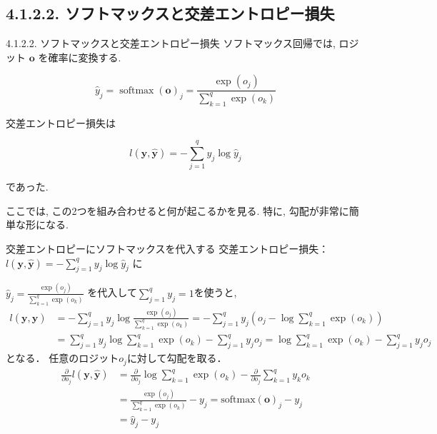 \documentclass[dvipdfmx,uplatex,11pt]{beamer}
\begin{document}
\subsection{4.1.2.2. ソフトマックスと交差エントロピー損失}
\begin{frame}{4.1.2.2. ソフトマックスと交差エントロピー損失}
ソフトマックス回帰では, ロジット $\bm o$ を確率に変換する.

\[
\hat y_j
=
\operatorname{softmax}(\bm o)_j
=
\frac{\exp(o_j)}
{\sum_{k=1}^{q}\exp(o_k)}
\]

交差エントロピー損失は

\[
l(\bm y,\hat{\bm y})
=
-\sum_{j=1}^{q}y_j\log \hat y_j
\]

であった.

\begin{d2lplainbox}
ここでは, この2つを組み合わせると何が起こるかを見る.
特に, 勾配が非常に簡単な形になる.
\end{d2lplainbox}
\end{frame}


\begin{frame}{交差エントロピーにソフトマックスを代入する}
交差エントロピー損失：$
l(\bm y,\hat{\bm y})
=
-\sum_{j=1}^{q}y_j\log \hat y_j
$
に

$
\hat y_j
=
\frac{\exp(o_j)}
{\sum_{k=1}^{q}\exp(o_k)}
$
を代入して$\sum_{j=1}^{q}y_j=1$を使うと,
{\small
\[
\begin{aligned}
  l(\bm y,\hat{\bm y})
&=
-\sum_{j=1}^{q}
y_j
\log
\frac{\exp(o_j)}
{\sum_{k=1}^{q}\exp(o_k)}
= 
-\sum_{j=1}^{q}
y_j
\left(
o_j
-
\log\sum_{k=1}^{q}\exp(o_k)
\right) \\
&= \sum_{j=1}^{q}
y_j
\log\sum_{k=1}^{q}\exp(o_k)
-
\sum_{j=1}^{q}y_j o_j
=
\log\sum_{k=1}^{q}\exp(o_k)
-
\sum_{j=1}^{q}y_j o_j 
\end{aligned}
\]}
となる．
任意のロジット$o_j$に対して勾配を取る．
{\small
\[
\begin{aligned}
  \frac{\partial}{\partial o_j} l(\bm y,\hat{\bm y})
&=
\frac{\partial}{\partial o_j}
\log\sum_{k=1}^{q}\exp(o_k)
-
\frac{\partial}{\partial o_j}\sum_{k=1}^{q}y_k o_k \\
&= \frac{\exp(o_j)}
{\sum_{k=1}^{q}\exp(o_k)}
-
y_j 
= \mathrm{softmax}(\bm o)_j - y_j \\
&= \hat y_j - y_j
\end{aligned}
\]}

\end{frame}
\end{document}
